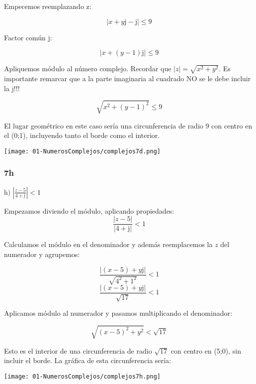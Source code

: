 \documentclass[11pt]{article}
\def\imj{\mathrm{j}}
\begin{document}
	\begin{center}
		Empecemos reemplazando z:
	\end{center}
	$$\left\vert x+y\imj-\imj\right\vert\leq9$$
	\begin{center}
		Factor común $\imj$:
	\end{center}
	$$\left\vert x + (y-1)\imj \right\vert \leq 9$$
	\begin{center}
		Apliquemos módulo al número complejo. Recordar que $\vert z \vert=\sqrt{x^2 + y^2}$. Es importante remarcar que a la parte imaginaria al cuadrado NO se le debe incluir la $\imj$!!!
	\end{center}
	$$\sqrt{x^2 + \left(y-1\right)^2} \leq 9$$
	\begin{center}
	\end{center}
	El lugar geométrico en este caso sería una circunferencia de radio 9 con centro en el (0;1), incluyendo tanto el borde como el interior. \\
	\begin{center}
		\texttt{[image: 01-NumerosComplejos/complejos7d.png]}
	\end{center}
	\pagebreak
	\subsubsection{7h}
	$\mathrm{h)}\; \displaystyle{\left\vert \frac{z-5}{4+\imj} \right\vert < 1}$
	
	Empezamos diviendo el módulo, aplicando propiedades:
	$$\displaystyle{\frac{\left\vert z-5 \right\vert}{\left\vert 4+\imj \right\vert} < 1}$$
	\begin{center}
		Calculamos el módulo en el denominador y además reemplacemos la $z$ del numerador y agrupemos:
	\end{center}
	$$\displaystyle{\frac{\left\vert (x-5)+y\imj \right\vert}{{\sqrt{4^2+1^2}}}<1}$$
	$$\displaystyle{\frac{\left\vert (x-5)+y\imj \right\vert}{{\sqrt{17}}}<1}$$
	\begin{center}
		Aplicamos módulo al numerador y pasamos multiplicando el denominador:
	\end{center}
	$$\displaystyle{\sqrt{ (x-5)^{2}+y^{2} } < \sqrt{17}}$$
	\begin{center}
	\end{center}
	\vspace*{0.5cm}
	Esto es el interior de una circunferencia de radio $\sqrt{17}$ con centro en (5;0), sin incluir el borde.
	La gráfica de esta circunferencia sería:
	\begin{center}
		\texttt{[image: 01-NumerosComplejos/complejos7h.png]}
	\end{center}
	
\end{document}
